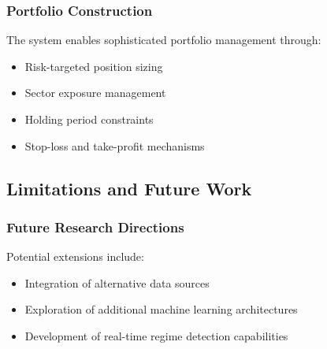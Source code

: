 \subsubsection{Portfolio Construction}
The system enables sophisticated portfolio management through:
\begin{itemize}
    \item Risk-targeted position sizing
    \item Sector exposure management
    \item Holding period constraints
    \item Stop-loss and take-profit mechanisms
\end{itemize}

\subsection{Limitations and Future Work}

\subsubsection{Future Research Directions}
Potential extensions include:
\begin{itemize}
    \item Integration of alternative data sources
    \item Exploration of additional machine learning architectures
    \item Development of real-time regime detection capabilities
\end{itemize}
